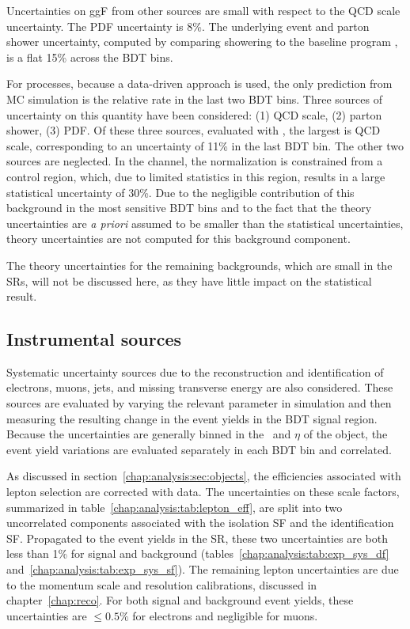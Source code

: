 Uncertainties on ggF from other sources are small with respect to the
QCD scale uncertainty. The PDF uncertainty is 8\%. The underlying
event and parton shower uncertainty, computed by comparing \HERWIG
showering to the baseline program \POWHEG, is a flat 15\% across the
BDT bins. 

For \ZDYll processes, because a data-driven approach is used, the only
prediction from MC simulation is the relative rate in the last two BDT
bins. Three sources of uncertainty
on this quantity have been considered: (1) QCD scale, (2) parton
shower, (3) PDF. Of these three sources, evaluated with \SHERPA, the
largest is QCD scale, corresponding to an uncertainty of 11\% in the
last BDT bin. The other two sources are neglected. In the \emme
channel, the \Ztautaunody normalization is constrained from a control
region, which, due to limited statistics in this region, results in a
large statistical uncertainty of 30\%. Due to the negligible
contribution of this background in the most sensitive BDT bins and to
the fact that the theory uncertainties are {\it a priori} assumed to
be smaller than the statistical uncertainties, theory uncertainties
are not computed for this background component. 

The theory uncertainties for the remaining backgrounds, which are
small in the SRs, will not be discussed here, as they have little
impact on the statistical result. 

\subsection{Instrumental sources}

Systematic uncertainty sources due to the reconstruction and identification of
electrons, muons, jets, and missing transverse energy are also
considered. These sources are evaluated by varying the relevant
parameter in simulation and then measuring the resulting change in the
event yields in the BDT signal region. Because the uncertainties are
generally binned in the \pt~and $\eta$ of the object, the event yield
variations are evaluated separately in each BDT bin and correlated.

As discussed in section~\ref{chap:analysis:sec:objects}, the
efficiencies associated with lepton selection are corrected with
data. The uncertainties on these scale factors, summarized in
table~\ref{chap:analysis:tab:lepton_eff}, are split into two
uncorrelated components associated with the isolation SF and
the identification SF. Propagated to the event yields in the SR, these
two uncertainties are both less than 1\% for signal and background
(tables~\ref{chap:analysis:tab:exp_sys_df}
and~\ref{chap:analysis:tab:exp_sys_sf}). The remaining lepton
uncertainties are due to the momentum scale and resolution calibrations,
discussed in chapter~\ref{chap:reco}. For both signal and background event
yields, these uncertainties are $\leq 0.5\%$ for electrons and
negligible for muons. 


